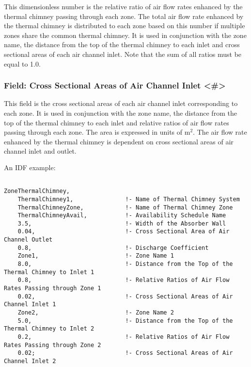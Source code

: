 This dimensionless number is the relative ratio of air flow rates enhanced by the thermal chimney passing through each zone. The total air flow rate enhanced by the thermal chimney is distributed to each zone based on this number if multiple zones share the common thermal chimney. It is used in conjunction with the zone name, the distance from the top of the thermal chimney to each inlet and cross sectional areas of each air channel inlet. Note that the sum of all ratios must be equal to 1.0.

\subsubsection{Field: Cross Sectional Areas of Air Channel Inlet \textless{}\#\textgreater{}}\label{field-cross-sectional-areas-of-air-channel-inlet}

This field is the cross sectional areas of each air channel inlet corresponding to each zone. It is used in conjunction with the zone name, the distance from the top of the thermal chimney to each inlet and relative ratios of air flow rates passing through each zone. The area is expressed in units of m\(^{2}\). The air flow rate enhanced by the thermal chimney is dependent on cross sectional areas of air channel inlet and outlet.

An IDF example:

\begin{lstlisting}

ZoneThermalChimney,
    ThermalChimney1,               !- Name of Thermal Chimney System
    ThermalChimneyZone,            !- Name of Thermal Chimney Zone
    ThermalChimneyAvail,           !- Availability Schedule Name
    3.5,                           !- Width of the Absorber Wall
    0.04,                          !- Cross Sectional Area of Air Channel Outlet
    0.8,                           !- Discharge Coefficient
    Zone1,                         !- Zone Name 1
    8.0,                           !- Distance from the Top of the Thermal Chimney to Inlet 1
    0.8,                           !- Relative Ratios of Air Flow Rates Passing through Zone 1
    0.02,                          !- Cross Sectional Areas of Air Channel Inlet 1
    Zone2,                         !- Zone Name 2
    5.0,                           !- Distance from the Top of the Thermal Chimney to Inlet 2
    0.2,                           !- Relative Ratios of Air Flow Rates Passing through Zone 2
    0.02;                          !- Cross Sectional Areas of Air Channel Inlet 2
\end{lstlisting}

